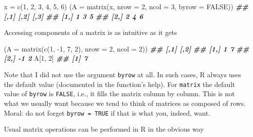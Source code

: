 \documentclass[
]{book}
\newenvironment{Shaded}{\begin{snugshade}}{\end{snugshade}}
\newcommand{\AttributeTok}[1]{\textcolor[rgb]{0.77,0.63,0.00}{#1}}
\newcommand{\ConstantTok}[1]{\textcolor[rgb]{0.00,0.00,0.00}{#1}}
\newcommand{\DecValTok}[1]{\textcolor[rgb]{0.00,0.00,0.81}{#1}}
\newcommand{\DocumentationTok}[1]{\textcolor[rgb]{0.56,0.35,0.01}{\textbf{\textit{#1}}}}
\newcommand{\FunctionTok}[1]{\textcolor[rgb]{0.00,0.00,0.00}{#1}}
\newcommand{\NormalTok}[1]{#1}
\newcommand{\OtherTok}[1]{\textcolor[rgb]{0.56,0.35,0.01}{#1}}
\newcommand{\SpecialCharTok}[1]{\textcolor[rgb]{0.00,0.00,0.00}{#1}}
\theoremstyle{definition}
\theoremstyle{definition}
\theoremstyle{definition}
\theoremstyle{definition}
\theoremstyle{remark}
\begin{document}
\begin{Shaded}
\begin{Highlighting}[]
\NormalTok{x }\OtherTok{=} \FunctionTok{c}\NormalTok{(}\DecValTok{1}\NormalTok{, }\DecValTok{2}\NormalTok{, }\DecValTok{3}\NormalTok{, }\DecValTok{4}\NormalTok{, }\DecValTok{5}\NormalTok{, }\DecValTok{6}\NormalTok{)}
\NormalTok{(}\AttributeTok{A =} \FunctionTok{matrix}\NormalTok{(x, }\AttributeTok{nrow =} \DecValTok{2}\NormalTok{, }\AttributeTok{ncol =} \DecValTok{3}\NormalTok{, }\AttributeTok{byrow =} \ConstantTok{FALSE}\NormalTok{))}
\DocumentationTok{\#\#      [,1] [,2] [,3]}
\DocumentationTok{\#\# [1,]    1    3    5}
\DocumentationTok{\#\# [2,]    2    4    6}
\end{Highlighting}
\end{Shaded}

Accessing components of a matrix is as intuitive as it gets

\begin{Shaded}
\begin{Highlighting}[]
\NormalTok{(}\AttributeTok{A =} \FunctionTok{matrix}\NormalTok{(}\FunctionTok{c}\NormalTok{(}\DecValTok{1}\NormalTok{, }\SpecialCharTok{{-}}\DecValTok{1}\NormalTok{, }\DecValTok{7}\NormalTok{, }\DecValTok{2}\NormalTok{), }\AttributeTok{nrow =} \DecValTok{2}\NormalTok{, }\AttributeTok{ncol =} \DecValTok{2}\NormalTok{))}
\DocumentationTok{\#\#      [,1] [,2]}
\DocumentationTok{\#\# [1,]    1    7}
\DocumentationTok{\#\# [2,]   {-}1    2}
\NormalTok{A[}\DecValTok{1}\NormalTok{, }\DecValTok{2}\NormalTok{]}
\DocumentationTok{\#\# [1] 7}
\end{Highlighting}
\end{Shaded}

Note that I did not use the argument \texttt{byrow} at all. In such cases, R always uses the default value (documented in the function's help). For \texttt{matrix} the default value of \texttt{byrow} is \texttt{FALSE}, i.e., it fills the matrix column by column. This is not what we usually want because we tend to think of matrices as composed of rows. Moral: do not forget \texttt{byrow\ =\ TRUE} if that is what you, indeed, want.

Usual matrix operations can be performed in R in the obvious way
\end{document}
